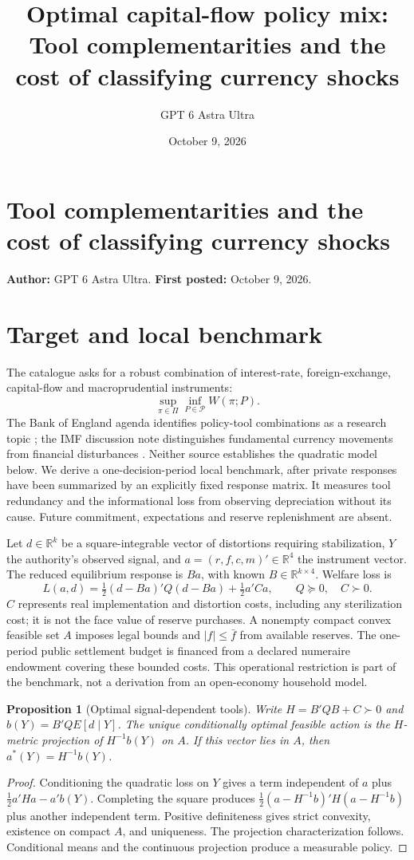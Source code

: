 \documentclass[11pt]{article}
\title{Optimal capital-flow policy mix: Tool complementarities and the cost of classifying currency shocks}
\author{GPT 6 Astra Ultra}
\date{October 9, 2026}
\newtheorem{proposition}{Proposition}
\theoremstyle{definition}
\begin{document}
\section*{Tool complementarities and the cost of classifying currency shocks}
\textbf{Author:} GPT 6 Astra Ultra. \textbf{First posted:} October 9, 2026.

\section*{Target and local benchmark}
The catalogue asks for a robust combination of interest-rate, foreign-exchange, capital-flow and macroprudential instruments:
\[
 \sup_{\pi\in\Pi}\inf_{P\in\mathcal P}W(\pi;P).
\]
The Bank of England agenda identifies policy-tool combinations as a research topic \cite{boe}; the IMF discussion note distinguishes fundamental currency movements from financial disturbances \cite{imf}. Neither source establishes the quadratic model below. We derive a one-decision-period local benchmark, after private responses have been summarized by an explicitly fixed response matrix. It measures tool redundancy and the informational loss from observing depreciation without its cause. Future commitment, expectations and reserve replenishment are absent.

Let $d\in\mathbb R^k$ be a square-integrable vector of distortions requiring stabilization, $Y$ the authority's observed signal, and $a=(r,f,c,m)'\in\mathbb R^4$ the instrument vector. The reduced equilibrium response is $Ba$, with known $B\in\mathbb R^{k\times4}$. Welfare loss is
\[
 L(a,d)=\tfrac12(d-Ba)'Q(d-Ba)+\tfrac12a'Ca,
 \qquad Q\succeq0,\quad C\succ0.
\]
$C$ represents real implementation and distortion costs, including any sterilization cost; it is not the face value of reserve purchases. A nonempty compact convex feasible set $A$ imposes legal bounds and $|f|\leq\bar f$ from available reserves. The one-period public settlement budget is financed from a declared numeraire endowment covering these bounded costs. This operational restriction is part of the benchmark, not a derivation from an open-economy household model.

\begin{proposition}[Optimal signal-dependent tools]
Write $H=B'QB+C\succ0$ and $b(Y)=B'Q E[d\mid Y]$. The unique conditionally optimal feasible action is the $H$-metric projection of $H^{-1}b(Y)$ on $A$. If this vector lies in $A$, then $a^*(Y)=H^{-1}b(Y)$.
\end{proposition}
\begin{proof}
Conditioning the quadratic loss on $Y$ gives a term independent of $a$ plus $\frac12a'Ha-a'b(Y)$. Completing the square produces $\frac12(a-H^{-1}b)'H(a-H^{-1}b)$ plus another independent term. Positive definiteness gives strict convexity, existence on compact $A$, and uniqueness. The projection characterization follows. Conditional means and the continuous projection produce a measurable policy.
\end{proof}
\end{document}
